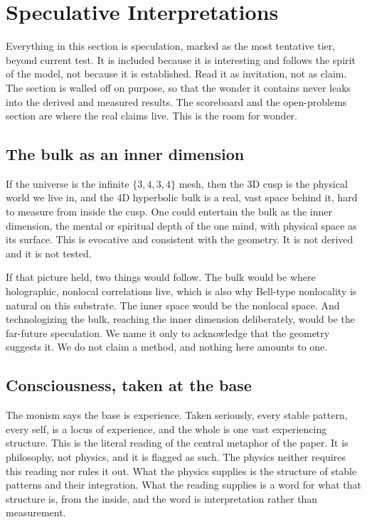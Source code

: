 \section{Speculative Interpretations}

Everything in this section is speculation, marked as the most tentative tier, beyond current test. It is included
because it is interesting and follows the spirit of the model, not because it is established. Read it as
invitation, not as claim. The section is walled off on purpose, so that the wonder it contains never leaks into the
derived and measured results. The scoreboard and the open-problems section are where the real claims live. This is
the room for wonder.

\subsection{The bulk as an inner dimension}

If the universe is the infinite $\{3,4,3,4\}$ mesh, then the $3$D cusp is the physical world we live in, and the
$4$D hyperbolic bulk is a real, vast space behind it, hard to measure from inside the cusp. One could entertain
the bulk as the inner dimension, the mental or spiritual depth of the one mind, with physical space as its
surface. This is evocative and consistent with the geometry. It is not derived and it is not tested.

If that picture held, two things would follow. The bulk would be where holographic, nonlocal correlations live,
which is also why Bell-type nonlocality is natural on this substrate. The inner space would be the nonlocal space.
And technologizing the bulk, reaching the inner dimension deliberately, would be the far-future speculation. We
name it only to acknowledge that the geometry suggests it. We do not claim a method, and nothing here amounts to
one.

\subsection{Consciousness, taken at the base}

The monism says the base is experience. Taken seriously, every stable pattern, every self, is a locus of
experience, and the whole is one vast experiencing structure. This is the literal reading of the central metaphor
of the paper. It is philosophy, not physics, and it is flagged as such. The physics neither requires this reading
nor rules it out. What the physics supplies is the structure of stable patterns and their integration. What the
reading supplies is a word for what that structure is, from the inside, and the word is interpretation rather than
measurement.

